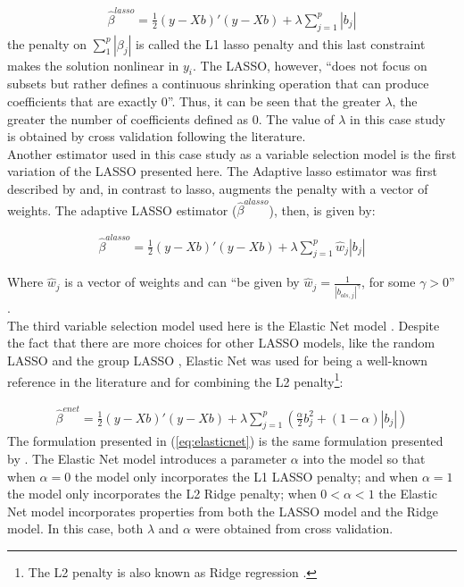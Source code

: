\begin{align} \label{eq:lasso}
    \hat{\beta}^{lasso} = \frac{1}{2}(y - Xb)'(y - Xb) + \lambda\sum_{j=1}^p|b_j|
\end{align}
the penalty on $\sum_1 ^p |\beta_j|$ is called the L1 lasso penalty \cite[p.68]{hastie2009elements} and this last constraint makes the solution nonlinear in $y_i$. The LASSO, however, ``does not focus on subsets but rather defines a continuous shrinking operation that can produce coefficients that are exactly 0''\cite[p.286]{tibshirani1996regression}. Thus, it can be seen that the greater $\lambda$, the greater the number of coefficients defined as 0. The value of $\lambda$ in this case study is obtained by cross validation following the literature\cite[p. 136]{hoornweg2018science}.\\

Another estimator used in this case study as a variable selection model is the first variation of the LASSO presented here. The  Adaptive lasso estimator was first described by \cite{zou2006adaptive} and, in contrast to lasso, augments the penalty with a vector of weights. The adaptive LASSO estimator ($\hat{\beta}^{alasso}$), then, is given by:

\begin{align} \label{eq:lassoadaptive}
    \hat{\beta}^{alasso} = \frac{1}{2}(y - Xb)'(y - Xb) + \lambda\sum_{j=1}^p\hat{w}_j |b_j|
\end{align}

Where $\hat{w}_j$ is a vector of weights and can ``be given by $\hat{w}_j = \frac{1}{|b_{ols, j}|^\gamma}$, for some $ \gamma > 0$'' \cite[p. 115]{hoornweg2018science}.\\

The third variable selection model used here is the Elastic Net model \cite[]{zou2005regularization}. Despite the fact that there are more choices for other LASSO models, like the random LASSO \cite[]{wang2011random} and the group LASSO \cite[]{yuan2006model}, Elastic Net was used for being a well-known reference in the literature and for combining the L2 penalty\footnote{The L2 penalty is also known as Ridge regression \cite[p.2]{owen2007robust}.}:

\begin{align}\label{eq:elasticnet}
    \hat{\beta}^{enet} = \frac{1}{2}(y - Xb)'(y - Xb) + \lambda\sum_{j=1}^p\left(\frac{\alpha}{2}b_j ^2 + (1 - \alpha)|b_j|\right)
\end{align}
The formulation presented in (\ref{eq:elasticnet}) is the same formulation presented by \cite{hastie2009elements}. The Elastic Net model introduces a parameter $\alpha$ into the model so that when $\alpha = 0$ the model only incorporates the L1 LASSO penalty; and when $\alpha = 1$ the model only incorporates the L2 Ridge penalty; when $0 < \alpha < 1$ the Elastic Net model incorporates properties from both the LASSO model and the Ridge model. In this case, both $\lambda$ and $\alpha$ were obtained from cross validation.

